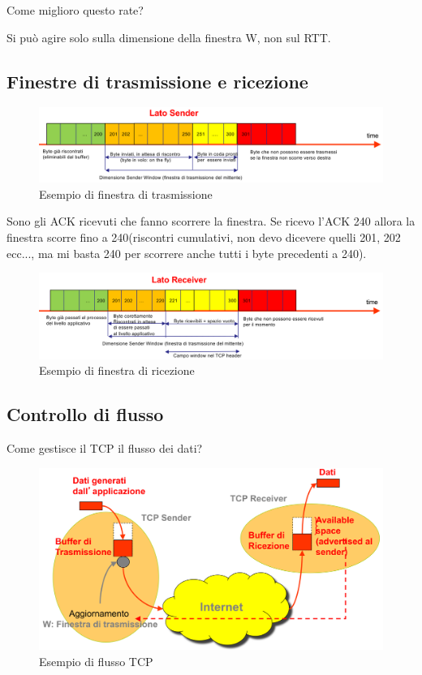 Come miglioro questo rate? 

Si può agire solo sulla dimensione della finestra W, non sul RTT.
\newpage

\subsection{Finestre di trasmissione e ricezione}
\begin{figure}[h!]
    \centering
    \includegraphics[width=1.2\textwidth]{images/finestratrasmissione.png}
    \caption{Esempio di finestra di trasmissione}
    \label{fig:finestratrasmissione}
\end{figure}

Sono gli ACK ricevuti che fanno scorrere la finestra. Se ricevo l'ACK 240 allora la finestra scorre fino a 240(riscontri cumulativi, non devo dicevere quelli 201, 202 ecc..., ma mi basta 240 per scorrere anche tutti i byte precedenti a 240).




\begin{figure}[h!]
    \centering
    \includegraphics[width=1.2\textwidth]{images/finestraricezione.png}
    \caption{Esempio di finestra di ricezione}
    \label{fig:finestraricezione}
\end{figure}


 \newpage
\subsection{Controllo di flusso}
Come gestisce il TCP il flusso dei dati?
\begin{figure}[h!]
    \centering
    \includegraphics[width=1\textwidth]{images/tcpflusso.png}
    \caption{Esempio di flusso TCP}
    \label{fig:tcpflusso}
\end{figure}


